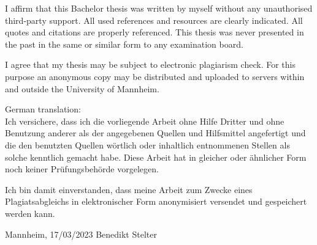 \documentclass{scrbook}
\begin{document}
I affirm that this Bachelor thesis was written by myself without any unauthorised third-party support. All used references and resources are clearly indicated. All quotes and citations are properly referenced. This thesis was never presented in the past in the same or similar form to any examination board. 

\noindent I agree that my thesis may be subject to electronic plagiarism check. For this purpose an anonymous copy may be distributed and uploaded to
servers within and outside the University of Mannheim.

\vspace{2\baselineskip}

\noindent German translation:\\
Ich versichere, dass ich die vorliegende Arbeit ohne Hilfe Dritter und ohne Benutzung anderer
als der angegebenen Quellen und Hilfsmittel angefertigt und die den benutzten Quellen
wörtlich oder inhaltlich entnommenen Stellen als solche kenntlich gemacht habe. Diese Arbeit
hat in gleicher oder ähnlicher Form noch keiner Prüfungsbehörde vorgelegen.

\noindent Ich bin damit einverstanden, dass meine Arbeit zum Zwecke eines Plagiatsabgleichs in
elektronischer Form anonymisiert versendet und gespeichert werden kann.

\vspace{4\baselineskip}
\begin{center}
\parbox{.8\textwidth}{Mannheim, 17/03/2023 \hfill Benedikt Stelter}
\end{center}


 
\end{document}
